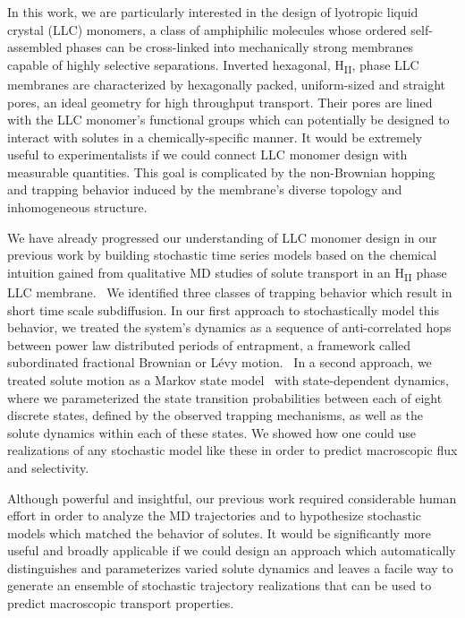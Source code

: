 \documentclass[journal=jpcbfk,manuscript=article]{achemso}
\begin{document}
  In this work, we are particularly interested in the design of lyotropic liquid 
  crystal (LLC) monomers, a class of amphiphilic molecules whose ordered self-assembled
  phases can be cross-linked into mechanically strong membranes capable of highly 
  selective separations. Inverted hexagonal, H\textsubscript{II}, phase LLC membranes
  are characterized	by hexagonally packed, uniform-sized and straight pores, an ideal
  geometry for high throughput transport. Their pores are lined with the LLC monomer's
  functional groups which can potentially be designed to interact with solutes in a 
  chemically-specific manner. It would be extremely useful to experimentalists if we 
  could connect LLC monomer design with measurable quantities. This goal is complicated
  by the non-Brownian hopping and trapping behavior induced by the membrane's diverse
  topology and inhomogeneous structure.~\cite{coscia_understanding_2019,coscia_chemically_2019}
  
  We have already progressed our understanding of LLC monomer design in our previous work
  by building stochastic time series models based on the chemical intuition gained
  from qualitative MD studies of solute transport in an H\textsubscript{II} phase LLC
  membrane.~\cite{coscia_chemically_2019,coscia_capturing_2020} We identified three 
  classes of trapping behavior which result in short time scale subdiffusion. In our 
  first approach to stochastically model this behavior, we treated the system's dynamics
  as a sequence of anti-correlated hops between power law distributed periods of 
  entrapment, a framework called subordinated fractional Brownian or L\'evy
  motion.~\cite{thiel_weak_2014,teuerle_modeling_2013} In a second approach, we treated 
  solute motion as a Markov state model~\cite{pande_everything_2010} with state-dependent
  dynamics, where we parameterized the state transition probabilities between each of
  eight discrete states, defined by the observed trapping mechanisms, as well as the 
  solute dynamics within each of these states. We showed how one could use realizations
  of any stochastic model like these in order to predict macroscopic flux and selectivity. 
  
  Although powerful and insightful, our previous work required considerable human effort
  in order to analyze the MD trajectories and to hypothesize stochastic models which
  matched the behavior of solutes. It would be significantly more useful and broadly 
  applicable if we could design an approach which automatically distinguishes and 
  parameterizes varied solute dynamics and leaves a facile way to generate an ensemble
  of stochastic trajectory realizations that can be used to predict macroscopic transport
  properties.
  
\end{document}
